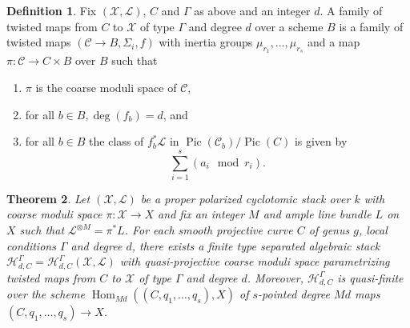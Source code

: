 \documentclass[a4paper,12pt]{amsart}
\newtheorem{thm}{Theorem}[section]
\theoremstyle{definition}
\newtheorem{defn}[thm]{Definition}
\newcommand{\cX}{\mathcal{X}}
\newcommand{\cC}{\mathcal{C}}
\newcommand{\cL}{\mathcal{L}}
\newcommand{\cH}{\mathcal{H}}
\DeclareMathOperator{\Pic}{Pic}
\DeclareMathOperator{\Hom}{Hom}
\begin{document}
	\begin{defn}\label{defn:twisted:maps} Fix $(\cX, \cL)$, $C$ and $\Gamma$ as above and an integer $d$. A family of twisted maps from $C$ to $\cX$ of type $\Gamma$ and degree $d$ over a scheme $B$ is a family of twisted maps $(\cC \to B, \Sigma_i, f)$ with inertia groups $\mu_{r_1}, \ldots, \mu_{r_s}$ and a map $\pi : \cC \to C \times B$ over $B$ such that 
		\begin{enumerate}
			\item $\pi$ is the coarse moduli space of $\cC$, 
			\item for all $b \in B, \deg(f_b) = d$, and
			\item for all $b \in B$ the class of $f_b^*\cL$ in $\Pic(\cC_b)/\Pic(C)$ is given by
			$$
			\sum_{i = 1}^s (a_i \mod r_i). 
			$$
		\end{enumerate}
	\end{defn}
	
	\begin{thm}\label{thm:moduli-of-twisted-maps-aov}
		Let $(\cX, \cL)$ be a proper polarized cyclotomic stack over $k$ with coarse moduli space $\pi : \cX \to X$ and fix an integer $M$ and ample line bundle $L$ on $X$ such that $\cL^{\otimes M} = \pi^*L$. For each smooth projective curve $C$ of genus $g$, local conditions $\Gamma$ and degree $d$, there exists a finite type separated algebraic stack $\cH^\Gamma_{d,C} = \cH^\Gamma_{d,C}(\cX, \cL)$ with quasi-projective coarse moduli space parametrizing twisted maps from $C$ to $\cX$ of type $\Gamma$ and degree $d$. Moreover, $\cH^\Gamma_{d,C}$ is quasi-finite over the scheme $\Hom_{Md}((C, q_1, \ldots, q_s), X)$ of $s$-pointed degree $Md$ maps $(C, q_1, \ldots, q_s) \to X$. 
	\end{thm}
	
\end{document}
